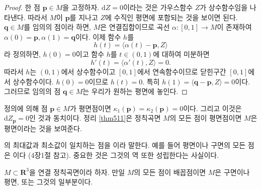 \begin{proof}
한 점 $ \mathbf{p} \in M$을 고정하자. $\mathrm{d}Z = 0$이라는 것은
가우스함수 $Z$가 상수함수임을 나타낸다. 따라서 $M$이
$ \mathbf{p}$를 지나고 $Z$에 수직인 평면에 포함되는 것을
 보이면 된다. $ \mathbf{q}\in M$를 임의의 점이라 하면,
$M$은 연결집합이므로 곡선 $\alpha :[0,1] \to M$이 존재하여
$\alpha(0) =  \mathbf{p}, \alpha(1) =  \mathbf{q}$이다.
이제 함수 $h$를
\[
h(t) = \langle \alpha(t) -  \mathbf{p}, Z \rangle
\]
라 정의하면, $h(0)  =  0$이고 함수 $h$를 $t \in (0,1)$에 대하여 미분하면
\[
h'(t) = \langle \alpha'(t), Z \rangle = 0.
\]
따라서 $h$는  $(0,1)$에서 상수함수이고 $[0,1]$에서 연속함수이므로
닫힌구간 $[0,1]$에서 상수함수이다. $h(0) = 0$이므로 $h(t) = 0$.
특히 $h(1) = \langle  \mathbf{q}-
 \mathbf{p}, Z\rangle = 0$이다. 그러므로 임의의 점
 $ \mathbf{q}\in M$는 우리가 원하는 평면에 놓인다.
\end{proof}

정의에 의해 점 $ \mathbf{p}\in M$가 평면점이면
$\kappa_1( \mathbf{p}) = \kappa_2( \mathbf{p}) = 0$이다. 그리고
이것은 $\mathrm{d}Z_{ \mathbf{p}} = 0$인 것과 동치이다.
정리 \ref{thm511}은 정칙곡면 $M$의 모든 점이 평면점이면 $M$은 평면이라는 것을
보여준다.

의 최대값과 최소값이 일치하는 점을 이라 말한다. 예를 들어
평면이나 구면의 모든 점은 이다 (4장1절 참고).
중요한 것은 그것의 역 또한 성립한다는 사실이다.

\begin{thm}\label{thm512}
$M \subset \mathbf{R}^3$을 연결 정칙곡면이라 하자. 만일 $M$의
모든 점이 배꼽점이면 $M$은 구면이나 평면, 또는 그것의 일부분이다.
\end{thm}

